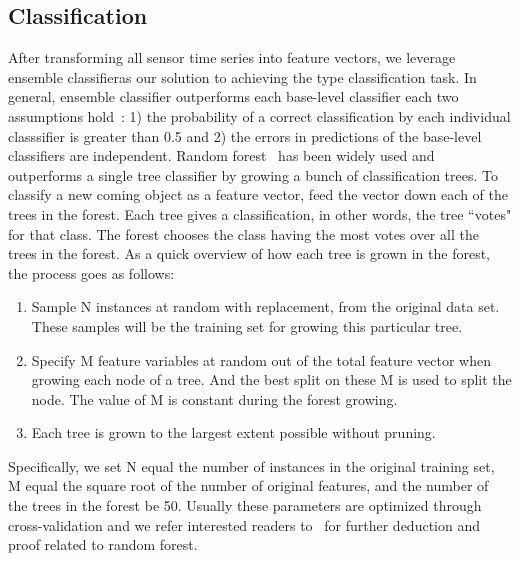 \subsection{Classification}
After transforming all sensor time series into feature vectors, we leverage ensemble classifieras our solution
to achieving the type classification task. In general, ensemble classifier outperforms each base-level classifier
each two assumptions hold~\cite{ensem}: 1) the probability of a correct classification by each individual classsifier
is greater than 0.5 and 2) the errors in predictions of the base-level classifiers are independent. 
Random forest~\cite{RF} has been widely used and outperforms a single tree classifier by growing a bunch of
classification trees. To classify a new coming object as a feature vector, feed the vector down each of the trees
in the forest. Each tree gives a classification, in other words, the tree ``votes" for that class. The forest chooses
the class having the most votes over all the trees in the forest. As a quick overview of how each tree is grown in
the forest, the process goes as follows:
\begin{enumerate}
\item Sample N instances at random with replacement, from the original data set. These samples will be the training set for growing this particular tree.
\item Specify M feature variables at random out of the total feature vector when growing each node of a tree. And the best split on these M is used to split the node. The value of M is constant during the forest growing.
\item Each tree is grown to the largest extent possible without pruning.
\end{enumerate}
Specifically, we set N equal the number of instances in the original training set, M equal the square root of the
number of original features, and the number of the trees in the forest be 50. Usually these parameters are optimized
through cross-validation and we refer interested readers to~\cite{RF} for further deduction and proof related to
random forest.


